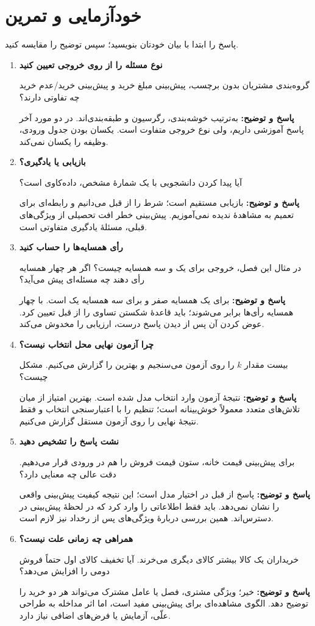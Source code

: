 \documentclass[12pt,a4paper,oneside]{report}
\newcounter{ex}[chapter]
\newenvironment{selftests}{\begin{enumerate}\setlength{\itemsep}{9pt}}{\end{enumerate}}
\newenvironment{selftest}[1]{\item\textbf{#1}\par}{\par}
\newcommand{\answer}[1]{\par{\color{teal}\bfseries پاسخ و توضیح: }#1\par}
\begin{document}
\section{خودآزمایی و تمرین}
پاسخ را ابتدا با بیان خودتان بنویسید؛ سپس توضیح را مقایسه کنید.
\begin{selftests}
\begin{selftest}{نوع مسئله را از روی خروجی تعیین کنید}
گروه‌بندی مشتریان بدون برچسب، پیش‌بینی مبلغ خرید و پیش‌بینی خرید/عدم خرید چه تفاوتی دارند؟
\answer{به‌ترتیب خوشه‌بندی، رگرسیون و طبقه‌بندی‌اند. در دو مورد آخر پاسخ آموزشی داریم، ولی نوع خروجی متفاوت است. یکسان بودن جدول ورودی، وظیفه را یکسان نمی‌کند.}
\end{selftest}
\begin{selftest}{بازیابی یا یادگیری؟}
آیا پیدا کردن دانشجویی با یک شمارهٔ مشخص، داده‌کاوی است؟
\answer{بازیابی مستقیم است؛ شرط را از قبل می‌دانیم و رابطه‌ای برای تعمیم به مشاهدهٔ ندیده نمی‌آموزیم. پیش‌بینی خطر افت تحصیلی از ویژگی‌های قبلی، مسئلهٔ یادگیری متفاوتی است.}
\end{selftest}
\begin{selftest}{رأی همسایه‌ها را حساب کنید}
در مثال این فصل، خروجی برای یک و سه همسایه چیست؟ اگر هر چهار همسایه رأی دهند چه مسئله‌ای پیش می‌آید؟
\answer{برای یک همسایه صفر و برای سه همسایه یک است. با چهار همسایه رأی‌ها برابر می‌شوند؛ باید قاعدهٔ شکستن تساوی را از قبل تعیین کرد. عوض کردن آن پس از دیدن پاسخ درست، ارزیابی را مخدوش می‌کند.}
\end{selftest}
\begin{selftest}{چرا آزمون نهایی محل انتخاب نیست؟}
بیست مقدار $k$ را روی آزمون می‌سنجیم و بهترین را گزارش می‌کنیم. مشکل چیست؟
\answer{نتیجهٔ آزمون وارد انتخاب مدل شده است. بهترین امتیاز از میان تلاش‌های متعدد معمولاً خوش‌بینانه است؛ تنظیم را با اعتبارسنجی انتخاب و فقط نتیجهٔ نهایی را روی آزمون مستقل گزارش می‌کنیم.}
\end{selftest}
\begin{selftest}{نشت پاسخ را تشخیص دهید}
برای پیش‌بینی قیمت خانه، ستون قیمت فروش را هم در ورودی قرار می‌دهیم. دقت عالی چه معنایی دارد؟
\answer{پاسخ از قبل در اختیار مدل است؛ این نتیجه کیفیت پیش‌بینی واقعی را نشان نمی‌دهد. باید فقط اطلاعاتی را وارد کرد که در لحظهٔ پیش‌بینی در دسترس‌اند. همین بررسی دربارهٔ ویژگی‌های پس از رخداد نیز لازم است.}
\end{selftest}
\begin{selftest}{همراهی چه زمانی علت نیست؟}
خریداران یک کالا بیشتر کالای دیگری می‌خرند. آیا تخفیف کالای اول حتماً فروش دومی را افزایش می‌دهد؟
\answer{خیر؛ ویژگی مشتری، فصل یا عامل مشترک می‌تواند هر دو خرید را توضیح دهد. الگوی مشاهده‌ای برای پیش‌بینی مفید است، اما اثر مداخله به طراحی علّی، آزمایش یا فرض‌های اضافی نیاز دارد.}
\end{selftest}
\end{selftests}

\end{document}
